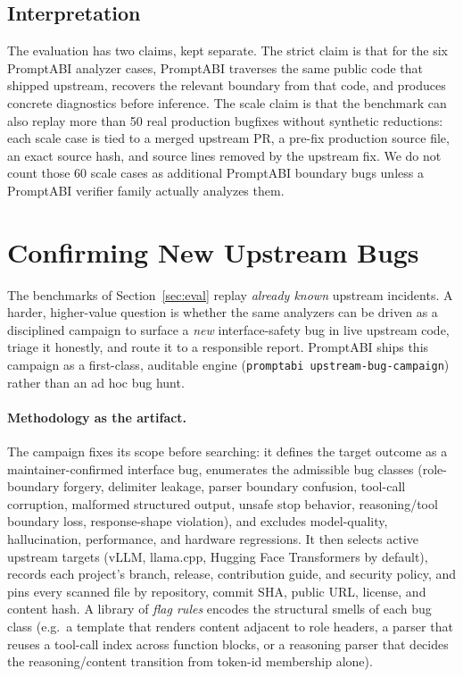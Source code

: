 \documentclass[10pt]{article}
\begin{document}
\subsection{Interpretation}

The evaluation has two claims, kept separate. The strict claim is that for the
six PromptABI analyzer cases, PromptABI traverses the same public code that
shipped upstream, recovers the relevant boundary from that code, and produces
concrete diagnostics before inference. The scale claim is that the benchmark can
also replay more than 50 real production bugfixes without synthetic reductions:
each scale case is tied to a merged upstream PR, a pre-fix production source
file, an exact source hash, and source lines removed by the upstream fix. We do
not count those 60 scale cases as additional PromptABI boundary bugs unless a
PromptABI verifier family actually analyzes them.

\section{Confirming New Upstream Bugs}
\label{sec:campaign}

The benchmarks of Section~\ref{sec:eval} replay \emph{already known} upstream
incidents. A harder, higher-value question is whether the same analyzers can be
driven as a disciplined campaign to surface a \emph{new} interface-safety bug in
live upstream code, triage it honestly, and route it to a responsible report.
PromptABI ships this campaign as a first-class, auditable engine
(\texttt{promptabi upstream-bug-campaign}) rather than an ad hoc bug hunt.

\paragraph{Methodology as the artifact.} The campaign fixes its scope before
searching: it defines the target outcome as a maintainer-confirmed interface bug,
enumerates the admissible bug classes (role-boundary forgery, delimiter leakage,
parser boundary confusion, tool-call corruption, malformed structured output,
unsafe stop behavior, reasoning/tool boundary loss, response-shape violation),
and excludes model-quality, hallucination, performance, and hardware regressions.
It then selects active upstream targets (vLLM, llama.cpp, Hugging Face
Transformers by default), records each project's branch, release, contribution
guide, and security policy, and pins every scanned file by repository, commit
SHA, public URL, license, and content hash. A library of \emph{flag rules}
encodes the structural smells of each bug class (e.g.\ a template that renders
content adjacent to role headers, a parser that reuses a tool-call index across
function blocks, or a reasoning parser that decides the reasoning/content
transition from token-id membership alone).
\end{document}
